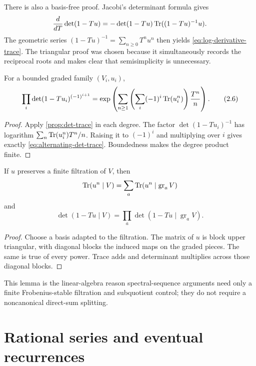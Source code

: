 \begin{remark}
There is also a basis-free proof.  Jacobi's determinant formula gives
\[
 \frac{d}{dT}\det(1-Tu)
 =-\det(1-Tu)\operatorname{Tr}((1-Tu)^{-1}u).
\]
The geometric series
\((1-Tu)^{-1}=\sum_{n\geq0}T^nu^n\) then yields
\eqref{eq:log-derivative-trace}.  The triangular proof was chosen because
it simultaneously records the reciprocal roots and makes clear that
semisimplicity is unnecessary.
\end{remark}

\begin{corollary}
\label{cor:alternating-det-trace}
For a bounded graded family \((V_i,u_i)\),
\[
 \prod_i\det(1-Tu_i)^{(-1)^{i+1}}
 =\exp\left(\sum_{n\geq1}
   \left(\sum_i(-1)^i\operatorname{Tr}(u_i^n)\right)\frac{T^n}{n}\right).
 \tag{2.6}\label{eq:alternating-det-trace}
\]
\end{corollary}

\begin{proof}
Apply \cref{prop:det-trace} in each degree.  The factor
\(\det(1-Tu_i)^{-1}\) has logarithm
\(\sum_n\operatorname{Tr}(u_i^n)T^n/n\).  Raising it to \((-1)^i\) and multiplying
over \(i\) gives exactly \eqref{eq:alternating-det-trace}.  Boundedness
makes the degree product finite.
\end{proof}

\begin{lemma}
\label{lem:det-trace-filtration}
If \(u\) preserves a finite filtration of \(V\), then
\[
 \operatorname{Tr}(u^n\mid V)=\sum_a\operatorname{Tr}(u^n\mid\operatorname{gr}_aV)
\]
and
\[
 \det(1-Tu\mid V)
 =\prod_a\det(1-Tu\mid\operatorname{gr}_aV).
\]
\end{lemma}

\begin{proof}
Choose a basis adapted to the filtration.  The matrix of \(u\) is block
upper triangular, with diagonal blocks the induced maps on the graded
pieces.  The same is true of every power.  Trace adds and determinant
multiplies across those diagonal blocks.
\end{proof}

This lemma is the linear-algebra reason spectral-sequence arguments need
only a finite Frobenius-stable filtration and subquotient control; they
do not require a noncanonical direct-sum splitting.

\section{Rational series and eventual recurrences}

